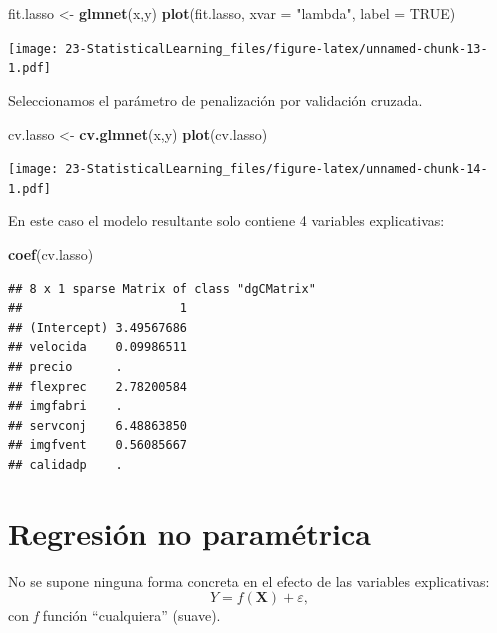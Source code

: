 \documentclass[]{book}
\newenvironment{Shaded}{\begin{snugshade}}{\end{snugshade}}
\newcommand{\DataTypeTok}[1]{\textcolor[rgb]{0.13,0.29,0.53}{#1}}
\newcommand{\KeywordTok}[1]{\textcolor[rgb]{0.13,0.29,0.53}{\textbf{#1}}}
\newcommand{\NormalTok}[1]{#1}
\newcommand{\OtherTok}[1]{\textcolor[rgb]{0.56,0.35,0.01}{#1}}
\newcommand{\StringTok}[1]{\textcolor[rgb]{0.31,0.60,0.02}{#1}}
\begin{document}
\begin{Shaded}
\begin{Highlighting}[]
\NormalTok{fit.lasso <-}\StringTok{ }\KeywordTok{glmnet}\NormalTok{(x,y)}
\KeywordTok{plot}\NormalTok{(fit.lasso, }\DataTypeTok{xvar =} \StringTok{"lambda"}\NormalTok{, }\DataTypeTok{label =} \OtherTok{TRUE}\NormalTok{)}
\end{Highlighting}
\end{Shaded}

\texttt{[image: 23-StatisticalLearning\_files/figure-latex/unnamed-chunk-13-1.pdf]}

Seleccionamos el parámetro de penalización por validación cruzada.

\begin{Shaded}
\begin{Highlighting}[]
\NormalTok{cv.lasso <-}\StringTok{ }\KeywordTok{cv.glmnet}\NormalTok{(x,y)}
\KeywordTok{plot}\NormalTok{(cv.lasso)}
\end{Highlighting}
\end{Shaded}

\texttt{[image: 23-StatisticalLearning\_files/figure-latex/unnamed-chunk-14-1.pdf]}

En este caso el modelo resultante solo contiene 4 variables explicativas:

\begin{Shaded}
\begin{Highlighting}[]
\KeywordTok{coef}\NormalTok{(cv.lasso)}
\end{Highlighting}
\end{Shaded}

\begin{verbatim}
## 8 x 1 sparse Matrix of class "dgCMatrix"
##                      1
## (Intercept) 3.49567686
## velocida    0.09986511
## precio      .         
## flexprec    2.78200584
## imgfabri    .         
## servconj    6.48863850
## imgfvent    0.56085667
## calidadp    .
\end{verbatim}

\hypertarget{regresion-no-parametrica}{%
\section{Regresión no paramétrica}\label{regresion-no-parametrica}}

No se supone ninguna forma concreta en el efecto de las variables explicativas:
\[Y=f\left(  \mathbf{X}\right)  +\varepsilon,\]
con \emph{f} función ``cualquiera'' (suave).
\end{document}
